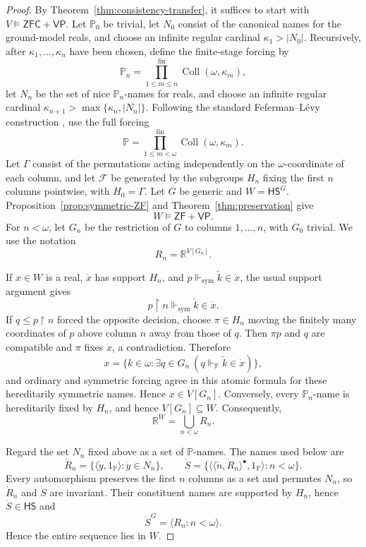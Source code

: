 \documentclass[11pt,a4paper]{amsart}
\newcommand{\VP}{\mathsf{VP}}
\newcommand{\ZF}{\mathsf{ZF}}
\newcommand{\ZFC}{\mathsf{ZFC}}
\newcommand{\HS}{\mathsf{HS}}
\newcommand{\forcesS}{\Vdash_{\mathrm{sym}}}
\newcommand{\restr}{\mathbin{\upharpoonright}}
\newcommand{\Coll}{\operatorname{Coll}}
\theoremstyle{plain}
\theoremstyle{definition}
\theoremstyle{remark}
\begin{document}
\begin{proof}
By Theorem~\ref{thm:consistency-transfer}, it suffices to start with $V\models\ZFC+\VP$.  {Let $\mathbb P_0$ be trivial, let $N_0$ consist of the canonical names for the ground-model reals, and choose an infinite regular cardinal $\kappa_1>|N_0|$.  Recursively, after $\kappa_1,\ldots,\kappa_n$ have been chosen, define the finite-stage forcing by
\[
\mathbb P_n=\prod_{1\leq m\leq n}^{\mathrm{fin}}\Coll(\omega,\kappa_m),
\]
let $N_n$ be the set of nice $\mathbb P_n$-names for reals, and choose an infinite regular cardinal $\kappa_{n+1}>\max\{\kappa_n,|N_n|\}$.}  Following the standard Feferman--L\'evy construction \cite[Theorem~10.6]{Jech}, use the full forcing
\[
{\mathbb P=\prod_{1\leq m<\omega}^{\mathrm{fin}}\Coll(\omega,\kappa_m).}
\]
Let $\Gamma$ consist of the permutations acting independently on the $\omega$-coordinate of each column, and let $\mathcal F$ be generated by the subgroups $H_n$ fixing the first $n$ columns pointwise, with $H_0=\Gamma$.  Let $G$ be generic and $W=\HS^G$.  Proposition~\ref{prop:symmetric-ZF} and Theorem~\ref{thm:preservation} give
\[
W\models\ZF+\VP.
\]
For $n<\omega$, let $G_n$ be the restriction of $G$ to columns $1,\ldots,n$, with $G_0$ trivial.  We use the notation
\[
{R_n=\mathbb R^{V[G_n]}.}
\]

If $x\in W$ is a real, $\dot x$ has support $H_n$, and $p\forcesS\check k\in\dot x$, the usual support argument gives
\[
p\restr n\forcesS\check k\in\dot x.
\]
If $q\leq p\restr n$ forced the opposite decision, choose $\pi\in H_n$ moving the finitely many coordinates of $p$ above column $n$ away from those of $q$.  Then $\pi p$ and $q$ are compatible and $\pi$ fixes $\dot x$, a contradiction.  {Therefore
\[
x=\{k\in\omega:\exists q\in G_n\ (q\Vdash_{\mathbb P}\check k\in\dot x)\},
\]
and ordinary and symmetric forcing agree in this atomic formula for these hereditarily symmetric names.  Hence $x\in V[G_n]$.  Conversely, every $\mathbb P_n$-name is hereditarily fixed by $H_n$, and hence $V[G_n]\subseteq W$.}  Consequently,
\[
\mathbb R^W=\bigcup_{n<\omega}R_n.
\]

{Regard the set $N_n$ fixed above as a set of $\mathbb P$-names.  The names used below are}
\[
\dot R_n=\{\langle\dot y,1_{\mathbb P}\rangle:\dot y\in N_n\},
\qquad
\dot S=\{\langle\langle\check n,\dot R_n\rangle^\bullet,1_{\mathbb P}\rangle:n<\omega\}.
\]
Every automorphism preserves the first $n$ columns as a set and permutes $N_n$, so $\dot R_n$ and $\dot S$ are invariant.  Their constituent names are supported by $H_n$, hence $\dot S\in\HS$ and
\[
\dot S^G=\langle R_n:n<\omega\rangle.
\]
Hence the entire sequence lies in $W$.


\end{proof}
\end{document}
